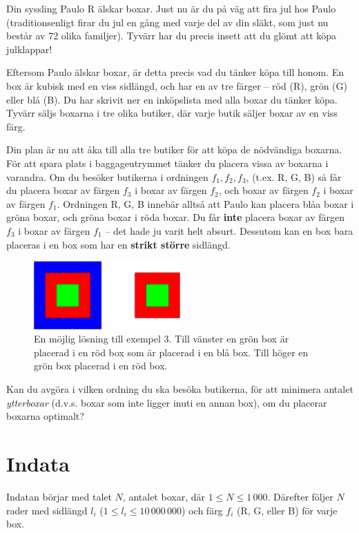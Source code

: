 Din syssling Paulo R älskar boxar.
Just nu är du på väg att fira jul hos Paulo (traditionsenligt firar du jul en gång med varje del av din släkt, som just nu består av 72 olika familjer).
Tyvärr har du precis insett att du glömt att köpa julklappar!

Eftersom Paulo älskar boxar, är detta precis vad du tänker köpa till honom.
En box är kubisk med en viss sidlängd, och har en av tre färger -- röd (R), grön (G) eller blå (B).
Du har skrivit ner en inköpslista med alla boxar du tänker köpa.
Tyvärr säljs boxarna i tre olika butiker, där varje butik säljer boxar av en viss färg.

Din plan är nu att åka till alla tre butiker för att köpa de nödvändiga boxarna.
För att spara plats i baggageutrymmet tänker du placera vissa av boxarna i varandra.
Om du besöker butikerna i ordningen $f_1, f_2, f_3$, (t.ex. R, G, B) så får du placera boxar av färgen $f_3$ i boxar av färgen $f_2$, och boxar av färgen $f_2$ i boxar av färgen $f_1$.
Ordningen R, G, B innebär alltså att Paulo kan placera blåa boxar i gröna boxar, och gröna boxar i röda boxar.
Du får \textbf{inte} placera boxar av färgen $f_3$ i boxar av färgen $f_1$ -- det hade ju varit helt absurt.
Dessutom kan en box bara placeras i en box som har en \textbf{strikt större} sidlängd.

\begin{figure}[h!]
  \centering
  \includegraphics[width=0.5\textwidth]{sample3}
  \caption{En möjlig lösning till exempel 3.
  Till vänster en grön box är placerad i en röd box som är placerad i en blå box.
  Till höger en grön box placerad i en röd box.}
  \label{fig:sample3}
\end{figure}

Kan du avgöra i vilken ordning du ska besöka butikerna, för att minimera antalet \emph{ytterboxar} (d.v.s. boxar som inte ligger inuti en annan box), om du placerar boxarna optimalt?

\section*{Indata}
Indatan börjar med talet $N$, antalet boxar, där $1\le N \le 1\,000$. Därefter följer $N$ rader med sidlängd
$l_i$ ($1 \le l_i \le 10\,000\,000$) och färg $f_i$ (R, G, eller B) för varje box.

